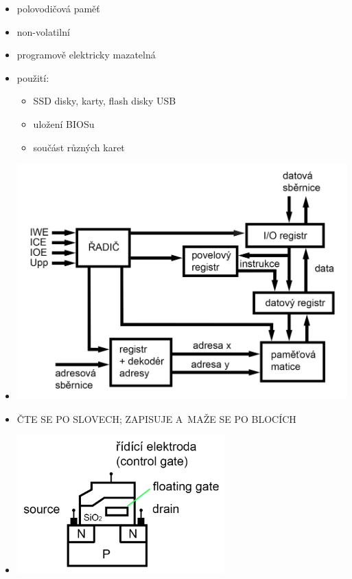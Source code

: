 \documentclass[a4paper,12pt]{article}
\providecommand{\tightlist}{%
\setlength{\itemsep}{0pt}\setlength{\parskip}{0pt}}
\begin{document}
\begin{itemize}
  \tightlist
  \item polovodičová paměť
  \item non-volatilní
  \item programově elektricky mazatelná
  \item použití:
  \begin{itemize}
    \tightlist
    \item SSD disky, karty, flash disky USB
    \item uložení BIOSu
    \item součást různých karet
  \end{itemize}
  \item[] \includegraphics[width=15cm]{ref/blokove-schema-flash-pameti.png}
  \item {\large ČTE SE PO SLOVECH; ZAPISUJE A~MAŽE SE PO BLOCÍCH}
  \item[]
  \begin{minipage}[b]{0.4\textwidth}
    \includegraphics[width=8cm]{ref/flash-tranzistor.png}
  \end{minipage}%
  \begin{minipage}[b]{0.5\textwidth}

\end{minipage}
\end{itemize}
\end{document}
